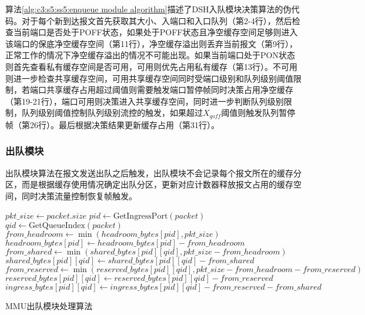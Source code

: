 算法\ref{alg:c3:s5:ss5:enqueue module algorithm}描述了DSH入队模块决策算法的伪代码。对于每个新到达报文首先获取其大小、入端口和入口队列（第2-4行），然后检查当前端口是否处于POFF状态，如果处于POFF状态且净空缓存空间足够则进入该端口的保底净空缓存空间（第11行），净空缓存溢出则丢弃当前报文（第9行），正常工作的情况下净空缓存溢出的情况不可能出现。如果当前端口处于PON状态则首先查看私有缓存空间是否可用，可用则优先占用私有缓存（第13行）。不可用则进一步检查共享缓存空间，可用共享缓存空间同时受端口级别和队列级别阈值限制，若端口共享缓存占用超过阈值则需要触发端口暂停帧同时决策占用净空缓存（第19-21行），端口可用则决策进入共享缓存空间，同时进一步判断队列级别限制，队列级别阈值控制队列级别流控的触发，如果超过$X_{qoff}$阈值则触发队列暂停帧（第26行）。最后根据决策结果更新缓存占用（第31行）。

\subsubsection{出队模块}
出队模块算法在报文发送出队之后触发，出队模块不会记录每个报文所在的缓存分区，而是根据缓存使用情况确定出队分区，更新对应计数器释放报文占用的缓存空间，同时决策流量控制恢复帧触发。

\begin{algorithm}[H]
  \small
  \SetAlCapFnt{\small}
  \SetAlCapNameFnt{\small}

  \SetAlgoVlined

  $pkt\_size \leftarrow packet.size$\;
  $pid \leftarrow \text{GetIngressPort}(packet)$\;
  $qid \leftarrow \text{GetQueueIndex}(packet)$\;
  $from\_headroom \leftarrow \min(headroom\_bytes[pid], pkt\_size)$\;
  $headroom\_bytes[pid] \leftarrow headroom\_bytes[pid] - from\_headroom$\;
  $from\_shared \leftarrow \min(shared\_bytes[pid][qid], pkt\_size-from\_headroom)$\;
  $shared\_bytes[pid][qid] \leftarrow shared\_bytes[pid][qid] - from\_shared$\;
  $from\_reserved \leftarrow \min(reserved\_bytes[pid][qid], pkt\_size-from\_headroom-from\_reserved)$\;
  $reserved\_bytes[pid][qid] \leftarrow reserved\_bytes[pid][qid] - from\_reserved$\;
  $ingress\_bytes[pid][qid] \leftarrow ingress\_bytes[pid][qid] - from\_reserved - from\_shared$\;

  \caption{MMU出队模块处理算法}
  \label{alg:c3:s5:ss5:dequeue module algorithm}
\end{algorithm}

